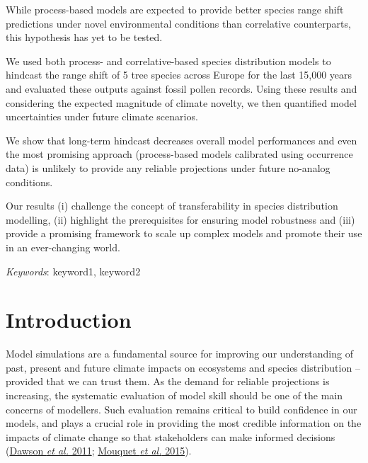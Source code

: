 \documentclass[11pt,]{article}
\renewenvironment{abstract}
 {{%
    \setlength{\leftmargin}{0mm}
    \setlength{\rightmargin}{\leftmargin}%
  }%
  \relax}
 {\endlist}
\begin{document}
\begin{abstract}

    \hbox{\vrule height .2pt width 39.14pc}

    \vskip 8.5pt %

\noindent While process-based models are expected to provide better
species range shift predictions under novel environmental conditions
than correlative counterparts, this hypothesis has yet to be tested.

We used both process- and correlative-based species distribution models
to hindcast the range shift of 5 tree species across Europe for the last
15,000 years and evaluated these outputs against fossil pollen records.
Using these results and considering the expected magnitude of climate
novelty, we then quantified model uncertainties under future climate
scenarios.

We show that long-term hindcast decreases overall model performances and
even the most promising approach (process-based models calibrated using
occurrence data) is unlikely to provide any reliable projections under
future no-analog conditions.

Our results (i) challenge the concept of transferability in species
distribution modelling, (ii) highlight the prerequisites for ensuring
model robustness and (iii) provide a promising framework to scale up
complex models and promote their use in an ever-changing world.


\vskip 8.5pt \noindent \emph{Keywords}: keyword1, keyword2 \par

    \hbox{\vrule height .2pt width 39.14pc}



\end{abstract}


\vskip -8.5pt



\noindent \doublespacing

\hypertarget{introduction}{%
\section{Introduction}\label{introduction}}

Model simulations are a fundamental source for improving our
understanding of past, present and future climate impacts on ecosystems
and species distribution -- provided that we can trust them. As the
demand for reliable projections is increasing, the systematic evaluation
of model skill should be one of the main concerns of modellers. Such
evaluation remains critical to build confidence in our models, and plays
a crucial role in providing the most credible information on the impacts
of climate change so that stakeholders can make informed decisions
(\protect\hyperlink{ref-Dawson2011}{Dawson \emph{et al.} 2011};
\protect\hyperlink{ref-Mouquet2015}{Mouquet \emph{et al.} 2015}).
\end{document}
